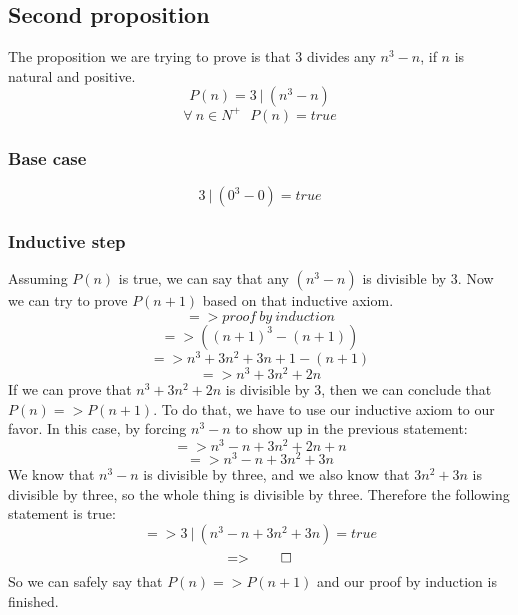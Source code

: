 \documentclass{article}
\begin{document}
	\pagebreak
	
	\subsection{Second proposition}
	The proposition we are trying to prove is that $3$ divides any $n^3 - n$, if $n$ is natural and positive.
	\begin{equation}
		P(n) = 3\ |\ (n^3 - n)
	\end{equation}
		\begin{equation}
			\forall\ n \in N^+\ \ \ P(n) = true
		\end{equation}
		
	\subsubsection{Base case}
	\begin{equation}
		3\ |\ (0^3 - 0) = true
	\end{equation}
	\subsubsection{Inductive step}
	Assuming $P(n)$ is true, we can say that any $(n^3 - n)$ is divisible by $3$.
	Now we can try to prove $P(n + 1)$ based on that inductive axiom.
	\begin{equation}
		=> proof\ by\ induction
	\end{equation}
	\begin{equation}
		=> ((n + 1)^3 - (n + 1))
	\end{equation}
	\begin{equation}
		=> n^3 + 3n^2 + 3n + 1 - (n + 1)
	\end{equation}
	\begin{equation}
		=> n^3 + 3n^2 + 2n
	\end{equation}
	If we can prove that $n^3 + 3n^2 + 2n$ is divisible by 3, then we can conclude that $P(n) => P(n + 1)$. To do that, we have to use our inductive axiom to our favor. In this case, by forcing $n^3 - n$ to show up in the previous statement:
	\begin{equation}
		=> n^3 - n + 3n^2 + 2n + n
	\end{equation}
	\begin{equation}
		=> n^3 - n + 3n^2 + 3n
	\end{equation}
	We know that $n^3 - n$ is divisible by three, and we also know that $3n^2 + 3n$ is divisible by three, so the whole thing is divisible by three. Therefore the following statement is true:
	\begin{equation}
		=> 3\ |\ (n^3 - n + 3n^2 + 3n) = true
	\end{equation}
	\begin{equation}
		=> \qed
	\end{equation}
	So we can safely say that $P(n) => P(n + 1)$ and our proof by induction is finished.
\end{document}
